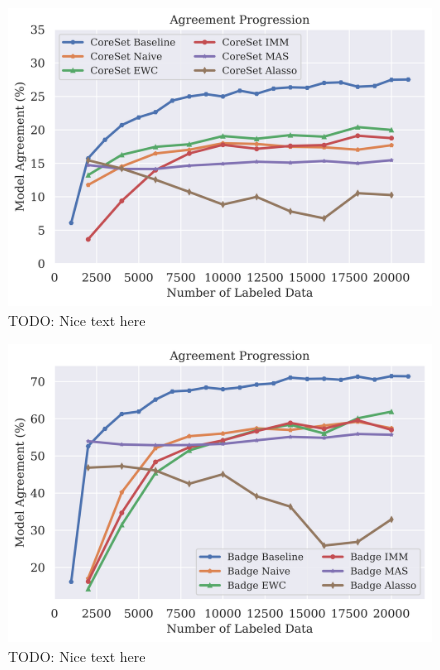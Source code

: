 \begin{figure}[h]
    \centering
    \includegraphics[width=0.8\linewidth]{images/results_CALMS/cifar100_softmax_coreset.png}
    \caption[Agreement Comparison for Model Stealing on CIFAR10 using the softmax output and the Active Learning strategy CoreSet]{TODO: Nice text here}
    \label{fig:CALMSCIFAR10SoftmaxCoreSet}
\end{figure}

\begin{figure}[h]
    \centering
    \includegraphics[width=0.8\linewidth]{images/results_CALMS/cifar_softmax_badge.png}
    \caption[Agreement Comparison for Model Stealing on CIFAR10 using the softmax output and the Active Learning strategy Badge]{TODO: Nice text here}
    \label{fig:CALMSCIFAR10SoftmaxBadge}
\end{figure}


